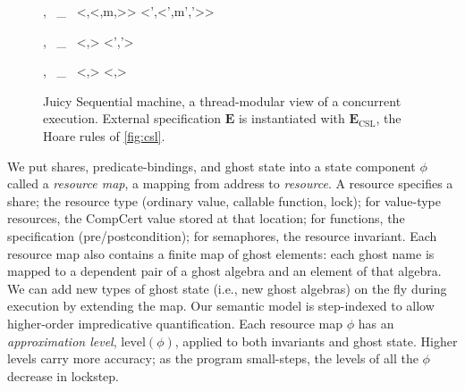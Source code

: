 \begin{figure}[t]
\vspace{-3ex}
\noindent{}
  {
, \Psi ~\vdash_~ \left<\sigma,\left<\phi,m,\mu\right>\right> \mapsto \left<\sigma',\left<\phi',m',\mu'\right>\right>
  }

\vspace{-1ex}
\noindent{}
 {
, \Psi ~\vdash_~
\left<\sigma,\right> \mapsto
\left<\sigma','\right>
} 

\vspace{-1ex}
\noindent{}
 {
, \Psi ~\vdash_~
\left<\sigma,\right> \mapsto
\left<\sigma,\right>
} 


\caption[Juicy Sequential machine]{Juicy Sequential machine, a thread-modular view of a
  concurrent execution.  External specification $\mathbf{E}$
  is instantiated with $\mathbf{E}_\mathrm{CSL}$, the Hoare rules of \autoref{fig:csl}.
}
\label{fig:juicyseq}
\end{figure}

We put shares, predicate-bindings, and ghost state
into a state component $\phi$ called a \emph{resource map},
a mapping from address to \emph{resource}.
A resource specifies a share;
the resource type (ordinary value, callable function, lock);
for value-type resources, the CompCert value stored at that location;
for functions, the specification (pre/postcondition);
for semaphores, the resource invariant.
Each resource map also contains a finite map of ghost elements: each ghost name is mapped to a dependent pair of a ghost algebra and an element of that algebra. We can add new types of ghost state (i.e., new ghost algebras) on the fly during execution by extending the map.
Our semantic model is step-indexed \cite{hobor10:popl} to allow higher-order
impredicative quantification.  Each resource map $\phi$
has an \emph{approximation level},
$\mathrm{level}(\phi)$, applied to both invariants and ghost state.
Higher levels carry more accuracy;
as the program small-steps, the levels of all the $\phi$ decrease in
lockstep.


